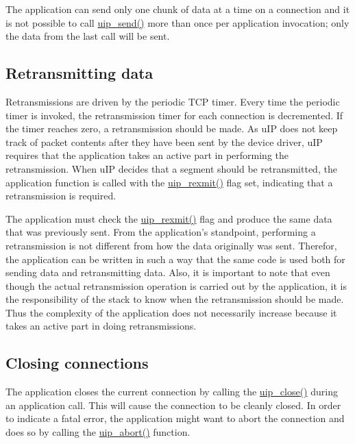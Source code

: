 The application can send only one chunk of data at a time on a connection and it is not possible to call \hyperlink{a00064_gb59415b2801e568f52bc1d86ef10e159}{uip\_\-send()} more than once per application invocation; only the data from the last call will be sent.\hypertarget{main_rexmitdata}{}\subsection{Retransmitting data}\label{main_rexmitdata}
Retransmissions are driven by the periodic TCP timer. Every time the periodic timer is invoked, the retransmission timer for each connection is decremented. If the timer reaches zero, a retransmission should be made. As u\-IP does not keep track of packet contents after they have been sent by the device driver, u\-IP requires that the application takes an active part in performing the retransmission. When u\-IP decides that a segment should be retransmitted, the application function is called with the \hyperlink{a00064_ga8933ad15a2e2947dae4a5cff50e6007}{uip\_\-rexmit()} flag set, indicating that a retransmission is required.

The application must check the \hyperlink{a00064_ga8933ad15a2e2947dae4a5cff50e6007}{uip\_\-rexmit()} flag and produce the same data that was previously sent. From the application's standpoint, performing a retransmission is not different from how the data originally was sent. Therefor, the application can be written in such a way that the same code is used both for sending data and retransmitting data. Also, it is important to note that even though the actual retransmission operation is carried out by the application, it is the responsibility of the stack to know when the retransmission should be made. Thus the complexity of the application does not necessarily increase because it takes an active part in doing retransmissions.\hypertarget{main_closing}{}\subsection{Closing connections}\label{main_closing}
The application closes the current connection by calling the \hyperlink{a00064_g61db1dcb7c760e4dd5d60bf4e5576dca}{uip\_\-close()} during an application call. This will cause the connection to be cleanly closed. In order to indicate a fatal error, the application might want to abort the connection and does so by calling the \hyperlink{a00064_g88d2ccf7cd821f89d9a8df7e3948b56c}{uip\_\-abort()} function.

